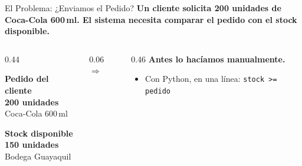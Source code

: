 \documentclass[aspectratio=169, 11pt]{beamer}
\begin{document}
\begin{frame}[shrink=10]{El Problema: ¿Enviamos el Pedido?}
  \vspace{-6pt}
  {\small\color{arcaDark}\bfseries
    Un cliente solicita 200 unidades de Coca-Cola 600\,ml.
    El sistema necesita \textbf{comparar} el pedido con el stock disponible.}

  \vspace{10pt}
  \begin{columns}[c]
    \begin{column}{0.44\textwidth}
      \centering
      \begin{tcolorbox}[
        colback=arcaGray, colframe=arcaDark, boxrule=0pt, leftrule=3pt,
        arc=3pt, left=5pt, right=5pt, top=6pt, bottom=6pt
      ]
        {\scriptsize\color{textMuted}\bfseries Pedido del cliente}\\[4pt]
        {\Large\bfseries\color{arcaDark} 200 unidades}\\[2pt]
        {\scriptsize\color{textMuted} Coca-Cola 600\,ml}
      \end{tcolorbox}

      \vspace{8pt}
      \begin{tcolorbox}[
        colback=arcaGray, colframe=arcaRed, boxrule=0pt, leftrule=3pt,
        arc=3pt, left=5pt, right=5pt, top=6pt, bottom=6pt
      ]
        {\scriptsize\color{textMuted}\bfseries Stock disponible}\\[4pt]
        {\Large\bfseries\color{arcaRed} 150 unidades}\\[2pt]
        {\scriptsize\color{textMuted} Bodega Guayaquil}
      \end{tcolorbox}
    \end{column}

    \begin{column}{0.06\textwidth}
      \centering
      {\Large\color{arcaRed}$\Rightarrow$}
    \end{column}

    \begin{column}{0.46\textwidth}
      {\footnotesize\color{arcaDark}\bfseries
        Antes lo hacíamos manualmente.\\[6pt]}

      {\footnotesize\color{textMuted}
      \begin{itemize}\setlength{\itemsep}{5pt}
        \item[{\color{arcaRed}\scriptsize\faArrowRight}]
          Con Python, en una línea:
          \texttt{stock >= pedido}


\end{itemize}}
\end{column}
\end{columns}
\end{frame}
\end{document}
